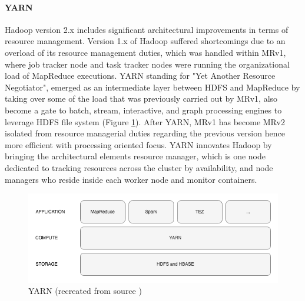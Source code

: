 \documentclass[review]{elsarticle}
\begin{document}
\paragraph{YARN}Hadoop version 2.x includes significant architectural improvements in terms of resource management. Version 1.x of Hadoop suffered shortcomings due to an overload of its resource management duties, which was handled within MRv1, where job tracker node and task tracker nodes were running the organizational load of MapReduce executions. YARN standing for "Yet Another Resource Negotiator", emerged as an intermediate layer between HDFS and MapReduce by taking over some of the load that was previously carried out by MRv1, also become a gate to batch, stream, interactive, and graph processing engines to leverage HDFS file system (Figure \ref{fig:YARNoverview}). After YARN, MRv1 has become MRv2 isolated from resource managerial duties regarding the previous version hence more efficient with processing oriented focus. YARN innovates Hadoop by bringing the architectural elements resource manager, which is one node dedicated to tracking resources across the cluster by availability, and node managers who reside inside each worker node and monitor containers.


\begin{figure}[h!]
	\caption{YARN (recreated from source \cite{dean_mapreduce_2004})}
	\label{fig:YARNoverview}
	\includegraphics[width=\textwidth]{YARNoverview}
	\centering
\end{figure}
\end{document}
